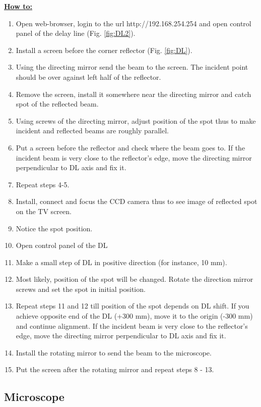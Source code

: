 \documentclass[14pt,a4paper] {article}
\begin{document}
\textbf{\underline{How to:}} 
\begin{enumerate}
\item Open web-browser, login to the url http://192.168.254.254 and open control panel of the delay line (Fig. \ref{fig:DL2}).
\item Install a screen before the corner reflector (Fig.  \ref{fig:DL}).
\item Using the directing mirror send the beam to the screen. The incident point should be over against left half of the reflector.
\item Remove the screen, install it somewhere near the directing mirror and catch spot of the reflected beam.
\item Using screws of the directing mirror, adjust position of the spot thus to make incident and reflected beams are roughly parallel.
\item Put a screen before the reflector and check where the beam goes to. If the incident beam is very close to the reflector's edge, move the directing mirror perpendicular to DL axis and fix it.
\item Repeat steps 4-5.
\item Install, connect and focus the CCD camera thus to see image of reflected spot on the TV screen.
\item Notice the spot position.
\item Open control panel of the DL
\item Make a small step of DL in positive direction (for instance, 10 mm).
\item Most likely, position of the spot will be changed. Rotate the direction mirror screws and set the spot in initial position.   
\item Repeat steps 11 and 12 till position of the spot depends on DL shift. If you achieve opposite end of the DL (+300 mm), move it to the origin (-300 mm) and continue alignment. If the incident beam is very close to the reflector's edge, move the directing mirror perpendicular to DL axis and fix it.
\item Install the rotating mirror to send the beam to the microscope.
\item Put the screen after the rotating mirror and repeat steps 8 - 13.
\end{enumerate}

 
\subsection{Microscope}
\end{document}
